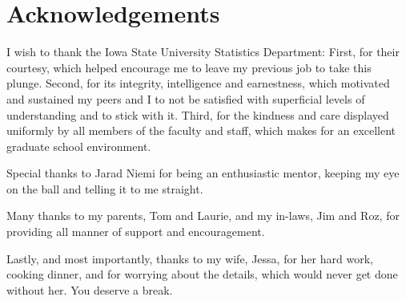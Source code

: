 \section*{Acknowledgements}
I wish to thank the Iowa State University Statistics Department: First, for their courtesy, which helped encourage me to leave my previous job to take this plunge. Second, for its integrity, intelligence and earnestness, which motivated and sustained my peers and I to not be satisfied with superficial levels of understanding and to stick with it. Third, for the kindness and care displayed uniformly by all members of the faculty and staff, which makes for an excellent graduate school environment.

Special thanks to Jarad Niemi for being an enthusiastic mentor, keeping my eye on the ball and telling it to me straight.

Many thanks to my parents, Tom and Laurie, and my in-laws, Jim and Roz, for providing all manner of support and encouragement.

Lastly, and most importantly, thanks to my wife, Jessa, for her hard work, cooking dinner, and for worrying about the details, which would never get done without her. You deserve a break.